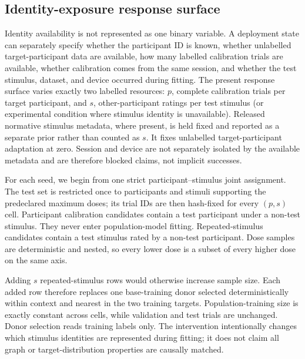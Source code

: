 \subsection{Identity-exposure response surface}
\label{app:exposure-surface}

Identity availability is not represented as one binary variable. A deployment
state can separately specify whether the participant ID is known, whether
unlabelled target-participant data are available, how many labelled calibration
trials are available, whether calibration comes from the same session, and
whether the test stimulus, dataset, and device occurred during fitting. The
present response surface varies exactly two labelled resources: $p$, complete
calibration trials per target participant, and $s$, other-participant ratings
per test stimulus (or experimental condition where stimulus identity is
unavailable). Released normative stimulus metadata, where present, is held fixed
and reported as a separate prior rather than counted as $s$. It fixes unlabelled
target-participant adaptation at zero. Session
and device are not separately isolated by the available metadata and are
therefore blocked claims, not implicit successes.

For each seed, we begin from one strict participant--stimulus joint assignment.
The test set is restricted once to participants and stimuli supporting the
predeclared maximum doses; its trial IDs are then hash-fixed for every $(p,s)$
cell. Participant calibration candidates contain a test participant under a
non-test stimulus. They never enter population-model fitting. Repeated-stimulus
candidates contain a test stimulus rated by a non-test participant. Dose samples
are deterministic and nested, so every lower dose is a subset of every higher
dose on the same axis.

Adding $s$ repeated-stimulus rows would otherwise increase sample size. Each
added row therefore replaces one base-training donor selected deterministically
within context and nearest in the two training targets. Population-training size
is exactly constant across cells, while validation and test trials are unchanged.
Donor selection reads training labels only. The intervention intentionally
changes which stimulus identities are represented during fitting; it does not
claim all graph or target-distribution properties are causally matched.

